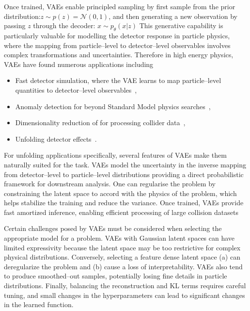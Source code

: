         Once trained, VAEs enable principled sampling by first sample from the prior distribution:\(z \sim p(z) = \mathcal{N}(0, 1)\), and then generating a new observation by passing \(z\) through the decoder: \(x \sim p_{\theta}(x|z)\)
        This generative capability is particularly valuable for modelling the detector response in particle physics, where the mapping from particle--level to detector--level observables involves complex transformations and uncertainties.
        Therefore in high energy physics, VAEs have found numerous applications including
        \begin{itemize}
            \item Fast detector simulation, where the VAE learns to map particle--level quantities to detector--level observables~\cite{Darulis2022MachineSimulations, hashemi_deep_2024},
            \item Anomaly detection for beyond Standard Model physics searches~\cite{liu_fast_2023},
            \item Dimensionality reduction of for processing collider data~\cite{yue_autoencoders_2024},
            \item Unfolding detector effects~\cite{erdmann_autoencoder-extended_2023}.
        \end{itemize}
        For unfolding applications specifically, several features of VAEs make them naturally suited for the task.
        VAEs model the uncertainty in the inverse mapping from detector--level to particle--level distributions providing a direct probabilistic framework for downstream analysis.
        One can regularise the problem by constraining the latent space to accord with the physics of the problem, which helps stabilize the training and reduce the variance.
        Once trained, VAEs provide fast amortized inference, enabling efficient processing of large collision datasets

        Certain challenges posed by VAEs must be considered when selecting the appropriate model for a problem.
        VAEs with Gaussian latent spaces can have limited expressivity because the latent space may be too restrictive for complex physical distributions.
        Conversely, selecting a feature dense latent space (a) can deregularize the problem and (b) cause a loss of interpretability.
        VAEs also tend to produce smoothed--out samples, potentially losing fine details in particle distributions.
        Finally, balancing the reconstruction and KL terms requires careful tuning, and small changes in the hyperparameters can lead to significant changes in the learned function.

